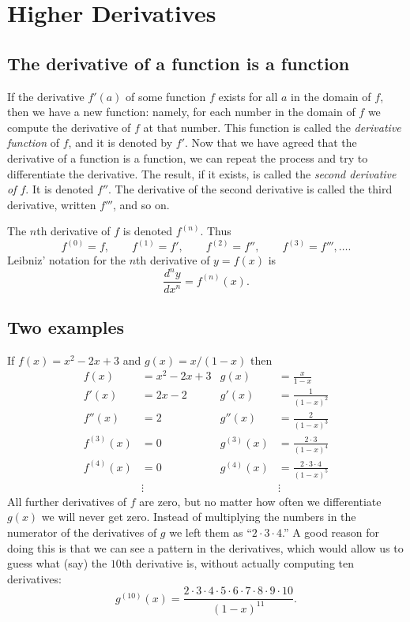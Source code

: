 \noproblemfont
\section{Higher Derivatives} 




\subsection{The derivative of a function is a function} 
If the derivative $f'(a)$ of some function $f$ exists for all $a$ in the domain
of $f$, then we have a new function: namely, for each number in the domain of
$f$ we compute the derivative of $f$ at that number.  This function is called
the \emph{derivative function} of $f$, and it is denoted by $f'$.  Now that we
have agreed that the derivative of a function is a function, we can repeat the
process and try to differentiate the derivative.  The result, if it exists, is
called the \emph{second derivative of $f$}.  It is denoted $f''$.  The
derivative of the second derivative is called the third derivative, written
$f'''$, and so on.




The $n$th derivative of $f$ is denoted $f^{(n)}$.  Thus
\[
f^{(0)}=f,\qquad f^{(1)}=f',\qquad f^{(2)}=f'',\qquad
f^{(3)}=f''',\ldots.
\]
Leibniz' notation for the $n$th derivative of $y=f(x)$ is
\[
\frac{d^ny}{dx^n}= f^{(n)}(x).
\]








\subsection{Two examples} 
If $f(x) = x^2-2x+3$ and $g(x) = x/(1-x)$ then
\begin{align*}
  f(x) &= x^2 - 2x + 3  & g(x)&= \frac{x} {1-x} \\
  f'(x) &= 2x -2 & g'(x) &= \frac{1} {(1-x)^2} \\
  f''(x) &= 2 & g''(x) &= \frac{2} {(1-x)^3} \\
  f^{(3)}(x) &= 0 & g^{(3)}(x) &= \frac{2\cdot 3} {(1-x)^4}\\
  f^{(4)}(x) &= 0 & g^{(4)}(x) &= \frac{2\cdot3\cdot4} {(1-x)^5}\\
  &\vdots &&\vdots
\end{align*}
All further derivatives of $f$ are zero, but no matter how often we
differentiate $g(x)$ we will never get zero.  Instead of multiplying the
numbers in the numerator of the derivatives of $g$ we left them as
``$2\cdot3\cdot4$.''  A good reason for doing this is that we can see
a pattern in the derivatives, which would allow us to guess what (say) the
$10$th derivative is, without actually computing ten derivatives:
\[
g^{(10)}(x) =
\frac{2\cdot3\cdot4\cdot5\cdot6\cdot7\cdot8\cdot9\cdot10} {(1-x)^{11}}.
\]








